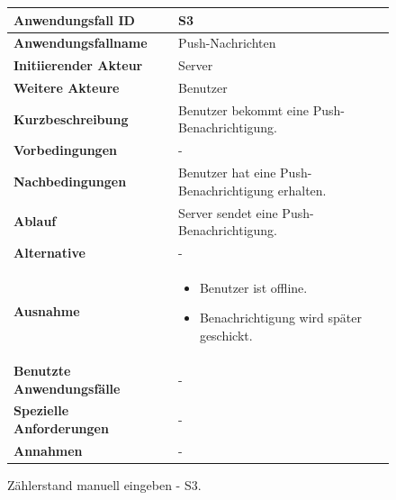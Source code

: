 \newpage

\begin{figure}[H]
	\centering
	\begin{tabularx}{\textwidth}{ X | X }
		\textbf{Anwendungsfall ID} & S3 \\ \hline
		\textbf{Anwendungsfallname} & Push-Nachrichten \\ \hline
		\textbf{Initiierender Akteur} & Server \\ \hline
		\textbf{Weitere Akteure} & Benutzer \\ \hline
		\textbf{Kurzbeschreibung} & Benutzer bekommt eine Push-Benachrichtigung. \\ \hline
		\textbf{Vorbedingungen} & - \\ \hline
		\textbf{Nachbedingungen} & Benutzer hat eine Push-Benachrichtigung erhalten. \\ \hline
		\textbf{Ablauf} & Server sendet eine Push-Benachrichtigung. \\ \hline
		\textbf{Alternative} & - \\ \hline
		\textbf{Ausnahme} &
		\begin{itemize}
			\item Benutzer ist offline.
			\item Benachrichtigung wird später geschickt.
		\end{itemize} \\ \hline
		\textbf{Benutzte Anwendungsfälle} & - \\ \hline
		\textbf{Spezielle Anforderungen} & - \\ \hline
		\textbf{Annahmen} & -
	\end{tabularx}
	\caption{Zählerstand manuell eingeben - S3.}
	\label{fig:anwendungsfall-server-tabelle-xx-1}
\end{figure}